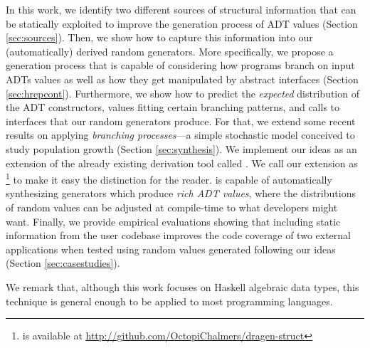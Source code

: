 In this work, we identify two different sources of structural information that
can be statically exploited to improve the generation process of ADT values
(Section \ref{sec:sources}).
%
%
Then, we show how to capture this information into our (automatically) derived
random generators.
%
More specifically, we propose a generation process that is capable of
considering how programs branch on input ADTs values as well as how they get
manipulated by abstract interfaces (Section \ref{sec:hrepcont}).
%
Furthermore, we show how to predict the \emph{expected} distribution of the ADT
constructors, values fitting certain branching patterns, and calls to interfaces
that our random generators produce.
%
For that, we extend some recent results on applying \emph{branching
  processes}\cite{gw1875}---a simple stochastic model conceived to study
population growth (Section \ref{sec:synthesis}).
%
%
We implement our ideas as an extension of the already existing derivation tool
called \dragen\cite{DBLP:conf/haskell/MistaRH18}. We call our extension as
\dragenp\footnote{\dragenp is available at
  \url{http://github.com/OctopiChalmers/dragen-struct}} to make it easy the
distinction for the reader.
%
\dragenp is capable of automatically synthesizing \quickcheck generators which
produce \emph{rich ADT values}, where the distributions of random values can be
adjusted at compile-time to what developers might want.
%
Finally, we provide empirical evaluations showing that including static
information from the user codebase improves the code coverage of two external
applications when tested using random values generated following our ideas
(Section \ref{sec:casestudies}).


We remark that, although this work focuses on Haskell algebraic data types, this
technique is general enough to be applied to most programming languages.
%

